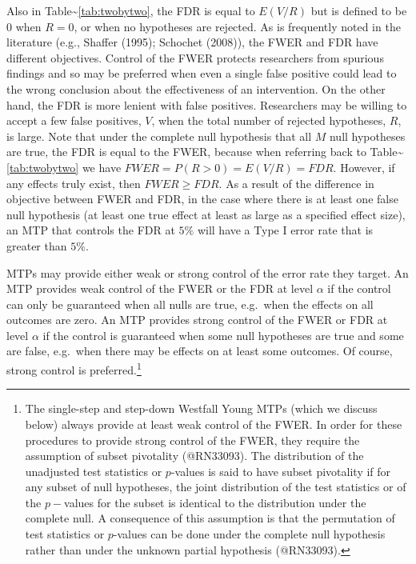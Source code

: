 \documentclass[
]{article}
\begin{document}
Also in Table\textasciitilde{}\ref{tab:twobytwo}, the FDR is equal to
\(E(V/R)\) but is defined to be \(0\) when \(R=0\), or when no
hypotheses are rejected. As is frequently noted in the literature (e.g.,
Shaffer (1995); Schochet (2008)), the FWER and FDR have different
objectives. Control of the FWER protects researchers from spurious
findings and so may be preferred when even a single false positive could
lead to the wrong conclusion about the effectiveness of an intervention.
On the other hand, the FDR is more lenient with false positives.
Researchers may be willing to accept a few false positives, \(V\), when
the total number of rejected hypotheses, \(R\), is large. Note that
under the complete null hypothesis that all \(M\) null hypotheses are
true, the FDR is equal to the FWER, because when referring back to
Table\textasciitilde{}\ref{tab:twobytwo} we have
\(FWER=P(R>0)=E(V/R)=FDR\). However, if any effects truly exist, then
\(FWER \geq FDR\). As a result of the difference in objective between
FWER and FDR, in the case where there is at least one false null
hypothesis (at least one true effect at least as large as a specified
effect size), an MTP that controls the FDR at \(5\%\) will have a Type I
error rate that is greater than \(5\%\).

MTPs may provide either weak or strong control of the error rate they
target. An MTP provides weak control of the FWER or the FDR at level
\(\alpha\) if the control can only be guaranteed when all nulls are
true, e.g.~when the effects on all outcomes are zero. An MTP provides
strong control of the FWER or FDR at level \(\alpha\) if the control is
guaranteed when some null hypotheses are true and some are false,
e.g.~when there may be effects on at least some outcomes. Of course,
strong control is
preferred.\footnote{The single-step and step-down Westfall Young MTPs (which we discuss below) always provide at least weak control of the FWER.
In order for these procedures to provide strong control of the FWER, they require the assumption of subset pivotality (@RN33093).
The distribution of the unadjusted test statistics or $p$-values is said to have subset pivotality if for any subset of null hypotheses, the joint distribution of the test statistics or of the $p-$values for the subset is identical to the distribution under the complete null.
A consequence of this assumption is that the permutation of test statistics or $p$-values can be done under the complete null hypothesis rather than under the unknown partial hypothesis (@RN33093).}
\end{document}
